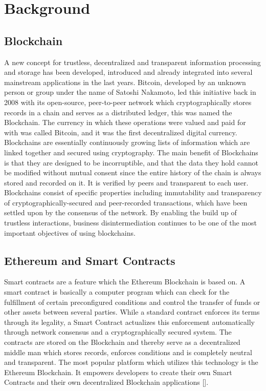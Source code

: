 \section{Background}

\subsection{Blockchain}

A new concept for trustless, decentralized and transparent information processing and storage has been developed, introduced and already integrated into several mainstream applications in the last years. Bitcoin, developed by an unknown person or group under the name of Satoshi Nakamoto, led this initiative back in 2008 with its open-source, peer-to-peer network which cryptographically stores records in a chain and serves as a distributed ledger, this was named the Blockchain. The currency in which these operations were valued and paid for with was called Bitcoin, and it was the first decentralized digital currency. 
Blockchains are essentially continuously growing lists of information which are linked together and secured using cryptography. The main benefit of Blockchains is that they are designed to be incorruptible, and that the data they hold cannot be modified without mutual consent since the entire history of the chain is always stored and recorded on it. It is verified by peers and transparent to each user. 
Blockchains consist of specific properties including immutability and transparency of cryptographically-secured and peer-recorded transactions, which have been settled upon by the consensus of the network. By enabling the build up of trustless interactions, business disintermediation continues to be one of the most important objectives of using blockchains.

\subsection{Ethereum and Smart Contracts}

Smart contracts are a feature which the Ethereum Blockchain is based on. A smart contract is basically a computer program which can check for the fulfillment of certain preconfigured conditions and control the transfer of funds or other assets between several parties. While a standard contract enforces its terms through its legality, a Smart Contract actualizes this enforcement automatically through network consensus and a cryptographically secured system. The contracts are stored on the Blockchain and thereby serve as a decentralized middle man which stores records, enforces conditions and is completely neutral and transparent. The most popular platform which utilizes this technology is the Ethereum Blockchain. It empowers developers to create their own Smart Contracts and their own decentralized Blockchain applications [\cite{Buterin2014}].  \\

